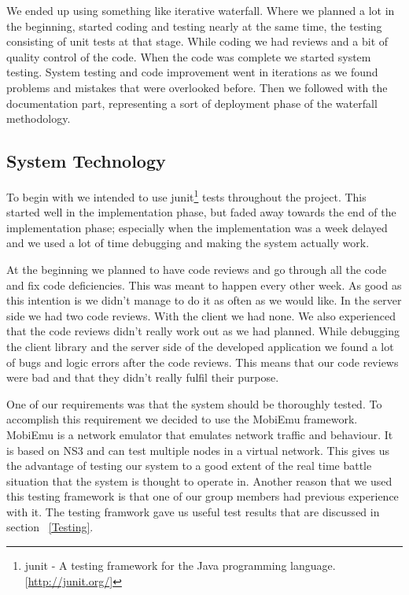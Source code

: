     We ended up using something like iterative waterfall. Where we planned a lot in the beginning, started coding and testing nearly at the same time, the testing consisting of unit tests at that stage. While coding we had reviews and a bit of quality control of the code. When the code was complete we started system testing. System testing and code improvement went in iterations as we found problems and mistakes that were overlooked before. Then we followed with the documentation part, representing a sort of deployment phase of the waterfall methodology. 

    \subsection{System Technology}\label{System Technology}
    
    To begin with we intended to use \gls{junit}\footnote{\gls{junit} - A testing framework for the Java programming language. [\url{http://junit.org/}]} tests throughout the project. This started well in the implementation phase, but faded away towards the end of the implementation phase; especially when the implementation was a week delayed and we used a lot of time debugging and making the system actually work. 
    
    At the beginning we planned to have code reviews and go through all the code and fix code deficiencies. This was meant to happen every other week. As good as this intention is we didn't manage to do it as often as we would like. In the server side we had two code reviews. With the client we had none. We also experienced that the code reviews didn't really work out as we had planned. While debugging the client library and the server side of the developed application we found a lot of bugs and logic errors after the code reviews. This means that our code reviews were bad and that they didn't really fulfil their purpose. 
    
    One of our requirements was that the system should be thoroughly tested. To accomplish this requirement we decided to use the MobiEmu framework. MobiEmu is a network emulator that emulates network traffic and behaviour. It is based on NS3 and can test multiple nodes in a virtual network. This gives us the advantage of testing our system to a good extent of the real time battle situation that the system is thought to operate in. Another reason that we used this testing framework is that one of our group members had previous experience with it. The testing framwork gave us useful test results that are discussed in section ~\ref{Testing}.

